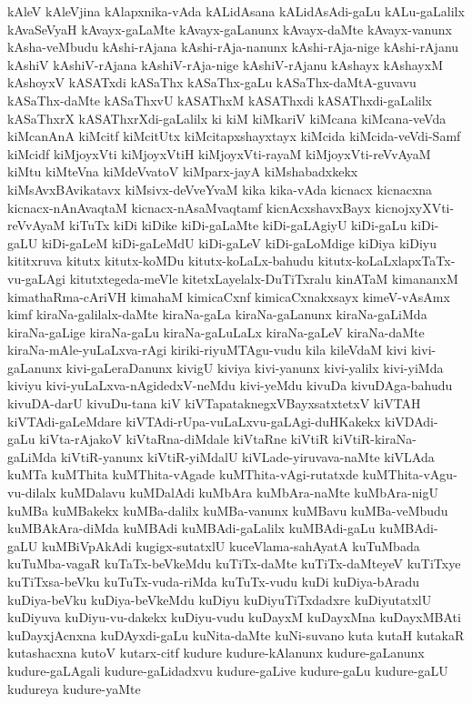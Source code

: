 {kAleV
kAleVjina
kAlapxnika-vAda
kALidAsana
kALidAsAdi-gaLu
kALu-gaLalilx
kAvaSeVyaH
kAvayx-gaLaMte
kAvayx-gaLanunx
kAvayx-daMte
kAvayx-vanunx
kAsha-veMbudu
kAshi-rAjana
kAshi-rAja-nanunx
kAshi-rAja-nige
kAshi-rAjanu
kAshiV
kAshiV-rAjana
kAshiV-rAja-nige
kAshiV-rAjanu
kAshayx
kAshayxM
kAshoyxV
kASATxdi
kASaThx
kASaThx-gaLu
kASaThx-daMtA-guvavu
kASaThx-daMte
kASaThxvU
kASAThxM
kASAThxdi
kASAThxdi-gaLalilx
kASaThxrX
kASAThxrXdi-gaLalilx
ki
kiM
kiMkariV
kiMcana
kiMcana-veVda
kiMcanAnA
kiMcitf
kiMcitUtx
kiMcitapxshayxtayx
kiMcida
kiMcida-veVdi-Samf
kiMcidf
kiMjoyxVti
kiMjoyxVtiH
kiMjoyxVti-rayaM
kiMjoyxVti-reVvAyaM
kiMtu
kiMteVna
kiMdeVvatoV
kiMparx-jayA
kiMshabadxkekx
kiMsAvxBAvikatavx
kiMsivx-deVveYvaM
kika
kika-vAda
kicnacx
kicnacxna
kicnacx-nAnAvaqtaM
kicnacx-nAsaMvaqtamf
kicnAcxshavxBayx
kicnojxyXVti-reVvAyaM
kiTuTx
kiDi
kiDike
kiDi-gaLaMte
kiDi-gaLAgiyU
kiDi-gaLu
kiDi-gaLU
kiDi-gaLeM
kiDi-gaLeMdU
kiDi-gaLeV
kiDi-gaLoMdige
kiDiya
kiDiyu
kititxruva
kitutx
kitutx-koMDu
kitutx-koLaLx-bahudu
kitutx-koLaLxlapxTaTx-vu-gaLAgi
kitutxtegeda-meVle
kitetxLayelalx-DuTiTxralu
kinATaM
kimananxM
kimathaRma-cAriVH
kimahaM
kimicaCxnf
kimicaCxnakxsayx
kimeV-vAsAmx
kimf
kiraNa-galilalx-daMte
kiraNa-gaLa
kiraNa-gaLanunx
kiraNa-gaLiMda
kiraNa-gaLige
kiraNa-gaLu
kiraNa-gaLuLaLx
kiraNa-gaLeV
kiraNa-daMte
kiraNa-mAle-yuLaLxva-rAgi
kiriki-riyuMTAgu-vudu
kila
kileVdaM
kivi
kivi-gaLanunx
kivi-gaLeraDanunx
kivigU
kiviya
kivi-yanunx
kivi-yalilx
kivi-yiMda
kiviyu
kivi-yuLaLxva-nAgidedxV-neMdu
kivi-yeMdu
kivuDa
kivuDAga-bahudu
kivuDA-darU
kivuDu-tana
kiV
kiVTapataknegxVBayxsatxtetxV
kiVTAH
kiVTAdi-gaLeMdare
kiVTAdi-rUpa-vuLaLxvu-gaLAgi-duHKakekx
kiVDAdi-gaLu
kiVta-rAjakoV
kiVtaRna-diMdale
kiVtaRne
kiVtiR
kiVtiR-kiraNa-gaLiMda
kiVtiR-yanunx
kiVtiR-yiMdalU
kiVLade-yiruvava-naMte
kiVLAda
kuMTa
kuMThita
kuMThita-vAgade
kuMThita-vAgi-rutatxde
kuMThita-vAgu-vu-dilalx
kuMDalavu
kuMDalAdi
kuMbAra
kuMbAra-naMte
kuMbAra-nigU
kuMBa
kuMBakekx
kuMBa-dalilx
kuMBa-vanunx
kuMBavu
kuMBa-veMbudu
kuMBAkAra-diMda
kuMBAdi
kuMBAdi-gaLalilx
kuMBAdi-gaLu
kuMBAdi-gaLU
kuMBiVpAkAdi
kugigx-sutatxlU
kuceVlama-sahAyatA
kuTuMbada
kuTuMba-vagaR
kuTaTx-beVkeMdu
kuTiTx-daMte
kuTiTx-daMteyeV
kuTiTxye
kuTiTxsa-beVku
kuTuTx-vuda-riMda
kuTuTx-vudu
kuDi
kuDiya-bAradu
kuDiya-beVku
kuDiya-beVkeMdu
kuDiyu
kuDiyuTiTxdadxre
kuDiyutatxlU
kuDiyuva
kuDiyu-vu-dakekx
kuDiyu-vudu
kuDayxM
kuDayxMna
kuDayxMBAti
kuDayxjAcnxna
kuDAyxdi-gaLu
kuNita-daMte
kuNi-suvano
kuta
kutaH
kutakaR
kutashacxna
kutoV
kutarx-citf
kudure
kudure-kAlanunx
kudure-gaLanunx
kudure-gaLAgali
kudure-gaLidadxvu
kudure-gaLive
kudure-gaLu
kudure-gaLU
kudureya
kudure-yaMte
}
